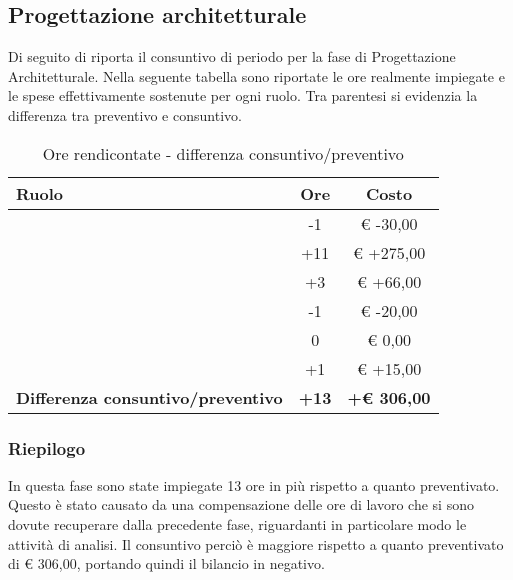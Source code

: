 	\subsection{Progettazione architetturale} %
	\label{sub:consuntivo_progettazione_architetturale}
		Di seguito di riporta il consuntivo di periodo per la fase di Progettazione Architetturale. \newline
		Nella seguente tabella sono riportate le ore realmente impiegate e le spese effettivamente sostenute per ogni ruolo. Tra parentesi si evidenzia la differenza tra preventivo e consuntivo.
		\begin{table}[!h]
			\begin{center}
				\begin{tabularx}{0.90\textwidth}{|X|c|c|}
					\hline
					\textbf{Ruolo} & \textbf{Ore} & \textbf{Costo} \\
					\hline
					\roleProjectManager & -1 & \euro{} -30,00 \\
					\hline
					\roleAnalyst & +11 &  \euro{} +275,00 \\
					\hline
					\roleDesigner & +3 & \euro{} +66,00 \\
					\hline
					\roleAdministrator & -1  & \euro{} -20,00 \\
					\hline
					\roleProgrammer & 0 & \euro{} 0,00 \\
					\hline
					\roleVerifier & +1 & \euro{} +15,00 \\
					\hline
					\textbf{Differenza consuntivo/preventivo} & \textbf{+13} & \textbf{+\euro{} 306,00} \\
					\hline
				\end{tabularx}
			\end{center}
		\caption{Ore rendicontate - differenza consuntivo/preventivo}
		\end{table}


		\subsubsection{Riepilogo} %
		In questa fase sono state impiegate 13 ore in più rispetto a quanto preventivato. \newline
		Questo è stato causato da una compensazione delle ore di lavoro che si sono dovute recuperare dalla precedente fase, riguardanti in particolare modo le attività di analisi. \newline
		Il consuntivo perciò è maggiore rispetto a quanto preventivato di \euro{} 306,00, portando quindi il bilancio in negativo.


